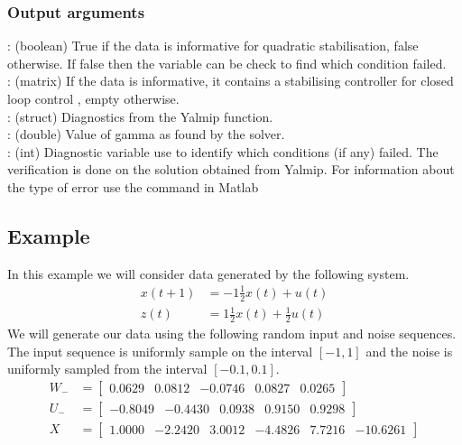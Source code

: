 \subsubsection*{Output arguments}
\textbf{}: (boolean) True if the data is informative for quadratic stabilisation, false otherwise. If false then the  variable can be check to find which condition failed. \\
\textbf{}: (matrix) If the data is informative, it contains a stabilising controller  for closed loop control , empty otherwise.\\
\textbf{}: (struct) Diagnostics from the Yalmip  function. \\
\textbf{}: (double) Value of gamma as found by the solver. \\
\textbf{}: (int) Diagnostic variable use to identify which conditions (if any) failed. The verification is done on the solution obtained from Yalmip. For information about the type of error use the  command in Matlab


\subsection{Example}
In this example we will consider data generated by the following system.
\begin{align*}
	x(t+1) &= -1\frac{1}{2}x(t) + u(t) \\
	z(t)   &=  1\frac{1}{2}x(t) + \frac{1}{2}u(t)
\end{align*}
We will generate our data using the following random input and noise sequences. The input sequence is uniformly sample on the interval $[-1,1]$ and the noise is uniformly sampled from the interval $[-0.1, 0.1]$.
\begin{align*}
	W_- &= \begin{bmatrix}  0.0629 &   0.0812 &  -0.0746 &   0.0827 &   0.0265 \end{bmatrix} \\
	U_- &= \begin{bmatrix} -0.8049 &  -0.4430 &   0.0938 &   0.9150 &   0.9298 \end{bmatrix} \\
	X   &= \begin{bmatrix}  1.0000 &  -2.2420 &   3.0012 &  -4.4826 &   7.7216 & -10.6261 \end{bmatrix}
\end{align*}

